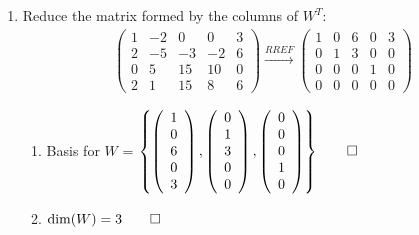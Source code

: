 \documentclass[12pt, a4paper]{article}
\begin{document}
\begin{enumerate}[Q\arabic*.]
    \pagebreak
  \item Reduce the matrix formed by the columns of $W^T$:
    \begin{align*}
      \left(\begin{array}{ccccc} 1 & -2 & 0 & 0 & 3\\ 2 & -5 & -3 & -2 & 6\\ 0 & 5 & 15 & 10 & 0\\ 2 & 1 & 15 & 8 & 6 \end{array}\right)
      \xrightarrow{RREF}
      \left(\begin{array}{ccccc} 1 & 0 & 6 & 0 & 3\\ 0 & 1 & 3 & 0 & 0\\ 0 & 0 & 0 & 1 & 0\\ 0 & 0 & 0 & 0 & 0 \end{array}\right)
    \end{align*}
    \begin{enumerate}[(\alph*)]
      \item Basis for $W$ = $\left\{ \left(\begin{array}{c} 1\\ 0\\ 6\\ 0\\ 3 \end{array}\right), \left(\begin{array}{c} 0\\ 1\\ 3\\ 0\\ 0 \end{array}\right), \left(\begin{array}{c} 0\\ 0\\ 0\\ 1\\ 0 \end{array}\right)\right\} \qed$ 
      \item $\dim(W) = 3\qed$

\end{enumerate}
\end{enumerate}
\end{document}
